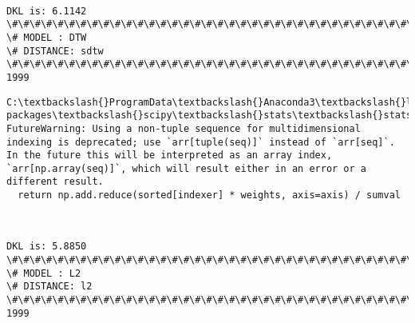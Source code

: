 \documentclass[11pt]{article}
\begin{document}
    \begin{center}
    \end{center}
    { \hspace*{\fill} \\}
    
    \begin{Verbatim}[commandchars=\\\{\}]
DKL is: 6.1142
\#\#\#\#\#\#\#\#\#\#\#\#\#\#\#\#\#\#\#\#\#\#\#\#\#\#\#\#\#\#\#\#\#\#\#\#\#\#\#\#\#\#\#\#\#\#\#\#\#\#\#\#\#\#\#\#\#\#\#\#\#\#\#\#\#\#\#\#\#\#\#\#\#\#\#\#
\# MODEL : DTW
\# DISTANCE: sdtw
\#\#\#\#\#\#\#\#\#\#\#\#\#\#\#\#\#\#\#\#\#\#\#\#\#\#\#\#\#\#\#\#\#\#\#\#\#\#\#\#\#\#\#\#\#\#\#\#\#\#\#\#\#\#\#\#\#\#\#\#\#\#\#\#\#\#\#\#\#\#\#\#\#\#\#\#
1999

    \end{Verbatim}

    \begin{Verbatim}[commandchars=\\\{\}]
C:\textbackslash{}ProgramData\textbackslash{}Anaconda3\textbackslash{}lib\textbackslash{}site-packages\textbackslash{}scipy\textbackslash{}stats\textbackslash{}stats.py:1706: FutureWarning: Using a non-tuple sequence for multidimensional indexing is deprecated; use `arr[tuple(seq)]` instead of `arr[seq]`. In the future this will be interpreted as an array index, `arr[np.array(seq)]`, which will result either in an error or a different result.
  return np.add.reduce(sorted[indexer] * weights, axis=axis) / sumval

    \end{Verbatim}

    \begin{center}
    \end{center}
    { \hspace*{\fill} \\}
    
    \begin{Verbatim}[commandchars=\\\{\}]
DKL is: 5.8850
\#\#\#\#\#\#\#\#\#\#\#\#\#\#\#\#\#\#\#\#\#\#\#\#\#\#\#\#\#\#\#\#\#\#\#\#\#\#\#\#\#\#\#\#\#\#\#\#\#\#\#\#\#\#\#\#\#\#\#\#\#\#\#\#\#\#\#\#\#\#\#\#\#\#\#\#
\# MODEL : L2
\# DISTANCE: l2
\#\#\#\#\#\#\#\#\#\#\#\#\#\#\#\#\#\#\#\#\#\#\#\#\#\#\#\#\#\#\#\#\#\#\#\#\#\#\#\#\#\#\#\#\#\#\#\#\#\#\#\#\#\#\#\#\#\#\#\#\#\#\#\#\#\#\#\#\#\#\#\#\#\#\#\#
1999

    \end{Verbatim}
\end{document}
